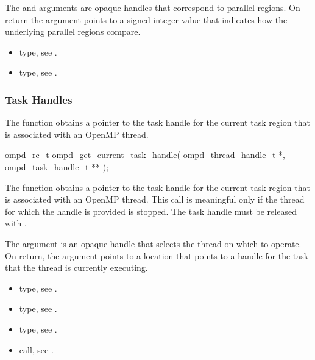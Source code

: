 \argdesc
The  and  arguments are 
opaque handles that correspond to parallel regions. On return the 
argument points to a signed integer value that indicates how the underlying 
parallel regions compare.

\crossreferences
\begin{itemize}
\item {} type, 
see .

\item {} type, see .
\end{itemize}



\subsubsection{Task Handles}



\label{subsubsubsec:ompd_get_current_task_handle}

\summary
The  function obtains a pointer to the task 
handle for the current task region that is associated with an OpenMP thread.

\format
\begin{cspecific}
\begin{ompSyntax}
ompd_rc_t ompd_get_current_task_handle(
  ompd_thread_handle_t *,
  ompd_task_handle_t **
);
\end{ompSyntax}
\end{cspecific}

\descr
The  function obtains a pointer to the task 
handle for the current task region that is associated with an OpenMP thread.
This call is meaningful only if the thread for which the handle is provided 
is stopped. The task handle must be released with .

\argdesc
The  argument is an opaque handle that selects the thread 
on which to operate. On return, the  argument points to a 
location that points to a handle for the task that the thread is currently 
executing.

\crossreferences
\begin{itemize}
\item {} type, 
see .

\item {} type, see .

\item {} type, see .

\item {} call, 
see .
\end{itemize}



